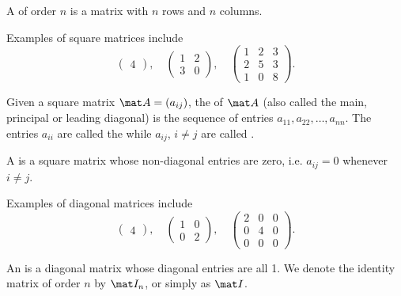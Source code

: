 \begin{definition}
    A  of order $n$ is a matrix with $n$ rows and $n$ columns.
\end{definition}

\begin{example}
    Examples of square matrices include \[\begin{pmatrix}4\end{pmatrix}, \quad \begin{pmatrix}1 & 2 \\ 3 & 0\end{pmatrix}, \quad \begin{pmatrix}1 & 2 & 3 \\ 2 & 5 & 3 \\ 1 & 0 & 8\end{pmatrix}.\]
\end{example}

\begin{definition}
    Given a square matrix $\mat A = (a_{ij})$, the  of $\mat A$ (also called the main, principal or leading diagonal) is the sequence of entries $a_{11}, a_{22}, \dots, a_{nn}$. The entries $a_{ii}$ are called the  while $a_{ij}$, $i \neq j$ are called .
\end{definition}

\begin{definition}
    A  is a square matrix whose non-diagonal entries are zero, i.e. $a_{ij} = 0$ whenever $i \neq j$.
\end{definition}

\begin{example}
    Examples of diagonal matrices include \[\begin{pmatrix}4\end{pmatrix}, \quad \begin{pmatrix}1 & 0 \\ 0 & 2\end{pmatrix}, \quad \begin{pmatrix}2 & 0 & 0 \\ 0 & 4 & 0 \\ 0 & 0 & 0\end{pmatrix}.\]
\end{example}

\begin{definition}
    An  is a diagonal matrix whose diagonal entries are all 1. We denote the identity matrix of order $n$ by $\mat I_n$, or simply as $\mat I$.
\end{definition}

